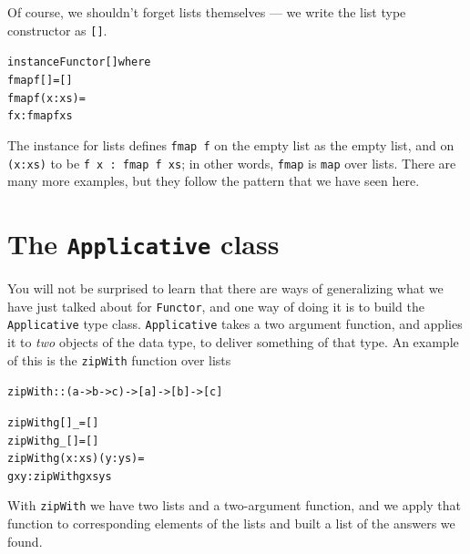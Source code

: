Of course, we shouldn't forget lists themselves — we write the list type constructor as \texttt{[]}.
\begin{alltt}
instance Functor [] where
  fmap f []  = []
  fmap f (x:xs) = 
       f x : fmap f xs
\end{alltt}
The instance for lists defines \texttt{fmap f} on the empty list as the empty list, and on \texttt{(x:xs)} to be \texttt{f x : fmap f xs}; in other words, \texttt{fmap} is \texttt{map} over lists. There are many more examples, but they follow the pattern that we have seen here.

\section{The \texttt{Applicative} class}

You will not be surprised to learn that there are ways of generalizing what we have just talked about for \texttt{Functor}, and one way of doing it is to build the \texttt{Applicative} type class. \texttt{Applicative} takes a two argument function, and applies it to \emph{two} objects of the data type, to deliver something of that type. An example of this is the \texttt{zipWith} function over lists
\begin{alltt}
zipWith :: (a -> b -> c) -> [a] -> [b] -> [c]

zipWith g [] _ = []
zipWith g _ [] = []
zipWith g (x:xs) (y:ys) =
  g x y : zipWith g xs ys
\end{alltt}
With \texttt{zipWith} we have two lists and a two-argument function, and we apply that function to corresponding elements of the lists and built a list of the answers we found.

